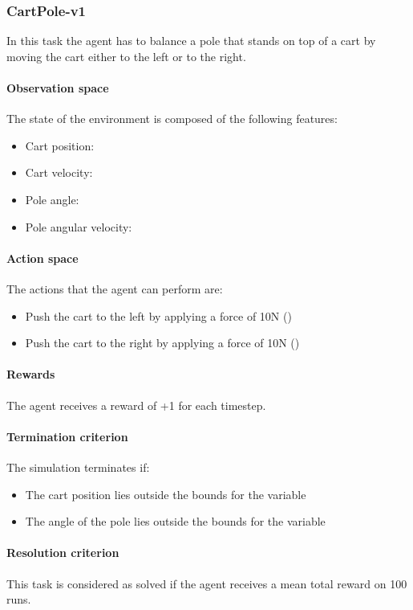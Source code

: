 \documentclass[review,english]{elsarticle}
\begin{document}
\subsubsection{CartPole-v1}
In this task the agent has to balance a pole that stands on top of a cart by moving the cart either to the left or to the right.

\paragraph{Observation space}
The state of the environment is composed of the following features:
\begin{itemize}
    \item Cart position: 
    \item Cart velocity: 
    \item Pole angle: 
    \item Pole angular velocity:  
\end{itemize}

\paragraph{Action space}
The actions that the agent can perform are:
\begin{itemize}
    \item Push the cart to the left by applying a force of 10N ()
    \item Push the cart to the right by applying a force of 10N ()
\end{itemize}

\paragraph{Rewards}
The agent receives a reward of +1 for each timestep.

\paragraph{Termination criterion}
The simulation terminates if:
\begin{itemize}
    \item The cart position lies outside the bounds for the  variable
    \item The angle of the pole lies outside the bounds for the  variable
\end{itemize}

\paragraph{Resolution criterion}
This task is considered as solved if the agent receives a mean total reward  on 100 runs.
\end{document}
